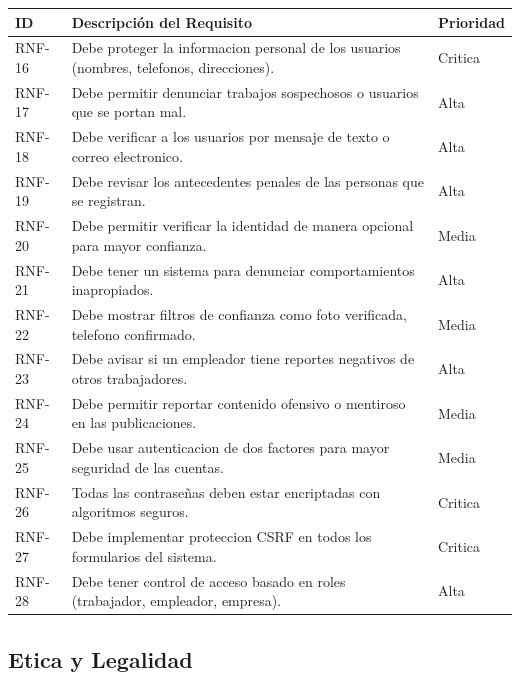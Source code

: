 \documentclass[12pt, a4paper]{article}
\begin{document}
\begin{longtable}{|p{2cm}|p{10cm}|p{2cm}|}
\hline
\textbf{ID} & \textbf{Descripción del Requisito} & \textbf{Prioridad} \\
\hline
\endhead

RNF-16 & Debe proteger la informacion personal de los usuarios (nombres, telefonos, direcciones). & Critica \\
\hline
RNF-17 & Debe permitir denunciar trabajos sospechosos o usuarios que se portan mal. & Alta \\
\hline
RNF-18 & Debe verificar a los usuarios por mensaje de texto o correo electronico. & Alta \\
\hline
RNF-19 & Debe revisar los antecedentes penales de las personas que se registran. & Alta \\
\hline
RNF-20 & Debe permitir verificar la identidad de manera opcional para mayor confianza. & Media \\
\hline
RNF-21 & Debe tener un sistema para denunciar comportamientos inapropiados. & Alta \\
\hline
RNF-22 & Debe mostrar filtros de confianza como foto verificada, telefono confirmado. & Media \\
\hline
RNF-23 & Debe avisar si un empleador tiene reportes negativos de otros trabajadores. & Alta \\
\hline
RNF-24 & Debe permitir reportar contenido ofensivo o mentiroso en las publicaciones. & Media \\
\hline
RNF-25 & Debe usar autenticacion de dos factores para mayor seguridad de las cuentas. & Media \\
\hline
RNF-26 & Todas las contraseñas deben estar encriptadas con algoritmos seguros. & Critica \\
\hline
RNF-27 & Debe implementar proteccion CSRF en todos los formularios del sistema. & Critica \\
\hline
RNF-28 & Debe tener control de acceso basado en roles (trabajador, empleador, empresa). & Alta \\
\hline
\end{longtable}

\subsection{Etica y Legalidad}
\end{document}
